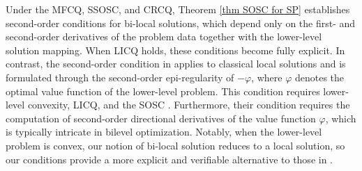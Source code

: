 \documentclass[11pt]{article}
\theoremstyle{definition}
\theoremstyle{remark}
\numberwithin{equation}{section}
\begin{document}
Under the MFCQ, SSOSC, and CRCQ, Theorem \ref{thm SOSC for SP} establishes second-order conditions for bi-local solutions, which depend only on the first- and second-order derivatives of the problem data together with the lower-level solution mapping. When LICQ holds, these conditions become fully explicit. In contrast, the second-order condition in \cite[Theorem 5.3]{Mehlitz 21} applies to classical local solutions and is formulated through the second-order epi-regularity of $-\varphi$, where $\varphi$ denotes the optimal value function of the lower-level problem.
This condition requires lower-level convexity, LICQ, and the SOSC \cite[Proposition 5.10]{Mehlitz 21}.
Furthermore, their condition requires the computation of second-order directional derivatives of the value function $\varphi$, which is typically intricate in bilevel optimization.
 Notably, when the lower-level problem is convex, our notion of bi-local solution reduces to a local solution, so our conditions provide a more explicit and verifiable alternative to those in \cite{Mehlitz 21}.


\end{document}
